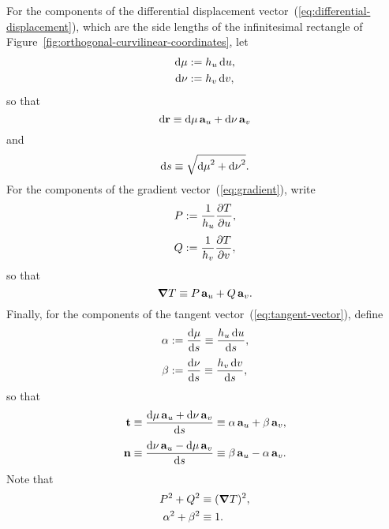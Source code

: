 For the components of the differential displacement
vector~(\ref{eq:differential-displacement}),
which are the side lengths of the infinitesimal rectangle
of Figure~\ref{fig:orthogonal-curvilinear-coordinates},
let
\begin{align}
  \td \mu &\defeq \scalefac[u] \td u,
    \label{eq:differential-displacement-u-component} \\
  \td \nu &\defeq \scalefac[v] \td v,
    \label{eq:differential-displacement-v-component}
\end{align}
so that
\begin{equation}
  \mathop{}\!\mathrm{d} \boldsymbol{\mathbf{r}} \equiv \mathop{}\!\mathrm{d} \mu \mathop{}\!\boldsymbol{\mathbf{a}}_{u} + \mathop{}\!\mathrm{d} \nu \mathop{}\!\boldsymbol{\mathbf{a}}_{v}
  \label{eq:differential-displacement-abbreviated}
\end{equation}
and
\begin{equation}
  \mathop{}\!\mathrm{d} s \equiv \sqrt{{\mathop{}\!\mathrm{d} \mu}^2 + {\mathop{}\!\mathrm{d} \nu}^2}.
  \label{eq:differential-arc-length-abbreviated}
\end{equation}
For the components of the gradient vector~(\ref{eq:gradient}),
write
\begin{align}
  P &\defeq \frac{1}{\scalefac[u]} \pder{T}{u},
    \label{eq:gradient-u-component} \\[\tallspace]
  Q &\defeq \frac{1}{\scalefac[v]} \pder{T}{v},
    \label{eq:gradient-v-component}
\end{align}
so that
\begin{equation}
  \mathop{}\!\boldsymbol{\mathbf{\nabla}} T \equiv P \mathop{}\!\boldsymbol{\mathbf{a}}_{u} + Q \mathop{}\!\boldsymbol{\mathbf{a}}_{v}.
  \label{eq:gradient-abbreviated}
\end{equation}
Finally, for the components of
the tangent vector~(\ref{eq:tangent-vector}), define
\begin{align}
  \alpha &\defeq \tder{\mu}{s} \ideq \frac{\scalefac[u] \td u}{\td s},
    \label{eq:tangent-u-component} \\[\tallspace]
  \beta &\defeq \tder{\nu}{s} \ideq \frac{\scalefac[v] \td v}{\td s},
    \label{eq:tangent-v-component}
\end{align}
so that
\begin{align}
  \tangentvec
  &\ideq \frac{\td \mu \basisvec{u} + \td \nu \basisvec{v}}{\td s}
  \ideq \alpha \basisvec{u} + \beta \basisvec{v},
    \label{eq:tangent-vector-abbreviated} \\[\tallspace]
  \normalvec
  &\ideq \frac{\td \nu \basisvec{u} - \td \mu \basisvec{v}}{\td s}
  \ideq \beta \basisvec{u} - \alpha \basisvec{v}.
    \label{eq:normal-vector-abbreviated}
\end{align}
Note that
\begin{align}
  P^2 + Q^2 &\equiv (\mathop{}\!\boldsymbol{\mathbf{\nabla}} T)^2, \label{eq:gradient-pythagoras} \\
  \alpha^2 + \beta^2 &\equiv 1. \label{eq:tangent-pythagoras}
\end{align}

